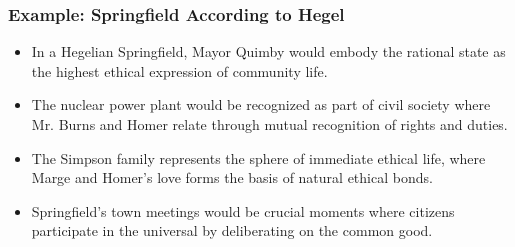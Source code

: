 \documentclass{beamer}
\begin{document}
\begin{frame}
    \frametitle{Example: Springfield According to Hegel}
    \begin{itemize}
        \item In a Hegelian Springfield, Mayor Quimby would embody the rational state as the highest ethical expression of community life.
        \item The nuclear power plant would be recognized as part of civil society where Mr. Burns and Homer relate through mutual recognition of rights and duties.
        \item The Simpson family represents the sphere of immediate ethical life, where Marge and Homer's love forms the basis of natural ethical bonds.
        \item Springfield's town meetings would be crucial moments where citizens participate in the universal by deliberating on the common good.
    \end{itemize}
    
    \begin{center}
    \end{center}
    \end{frame}
\end{document}
